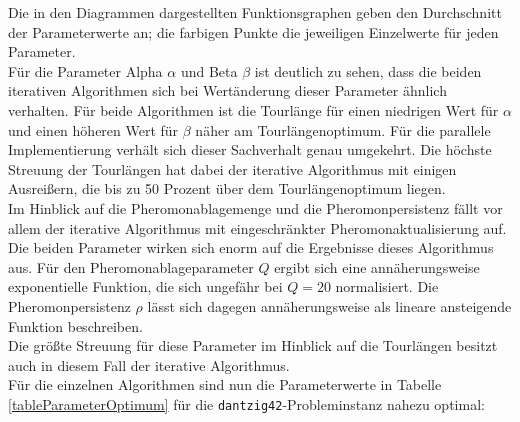 \documentclass[doktyp=barbeit, sprache=german]{TUBAFarbeiten}
\begin{document}
Die in den Diagrammen dargestellten Funktionsgraphen geben den Durchschnitt der Parameterwerte an; die farbigen Punkte die jeweiligen Einzelwerte für jeden Parameter.
\\Für die Parameter Alpha $\alpha$ und Beta $\beta$ ist deutlich zu sehen, dass die beiden iterativen Algorithmen sich bei Wertänderung dieser Parameter ähnlich verhalten. Für beide Algorithmen ist die Tourlänge für einen niedrigen Wert für $\alpha$ und einen höheren Wert für $\beta$ näher am Tourlängenoptimum. Für die parallele Implementierung verhält sich dieser Sachverhalt genau umgekehrt. Die höchste Streuung der Tourlängen hat dabei der iterative Algorithmus mit einigen Ausreißern, die bis zu 50 Prozent über dem Tourlängenoptimum liegen.
\\Im Hinblick auf die Pheromonablagemenge und die Pheromonpersistenz fällt vor allem der iterative Algorithmus mit eingeschränkter Pheromonaktualisierung auf. Die beiden Parameter wirken sich enorm auf die Ergebnisse dieses Algorithmus aus. Für den Pheromonablageparameter $Q$ ergibt sich eine annäherungsweise exponentielle Funktion, die sich ungefähr bei $Q = 20$ normalisiert. Die Pheromonpersistenz $\rho$ lässt sich dagegen annäherungsweise als lineare ansteigende Funktion beschreiben. 
\\Die größte Streuung für diese Parameter im Hinblick auf die Tourlängen besitzt auch in diesem Fall der iterative Algorithmus.
\\Für die einzelnen Algorithmen sind nun die Parameterwerte in Tabelle \ref{tableParameterOptimum} für die \texttt{dantzig42}-Probleminstanz nahezu optimal:
\begin{table}[]
\centering
{}
\captionsetup{justification=centering}
\caption[Übersicht der Parameterwerte, die bei jedem Algorithmus der Tourkonstruktion zu den besten Ergebnissen im Hinblick auf eine kurze Tourlänge führen]{Übersicht der Parameterwerte, die bei dem jeweiligen Algorithmus zu den besten Ergebnissen im Hinblick auf eine kurze Tourlänge führen}
\label{tableParameterOptimum}
\end{table}
\end{document}
